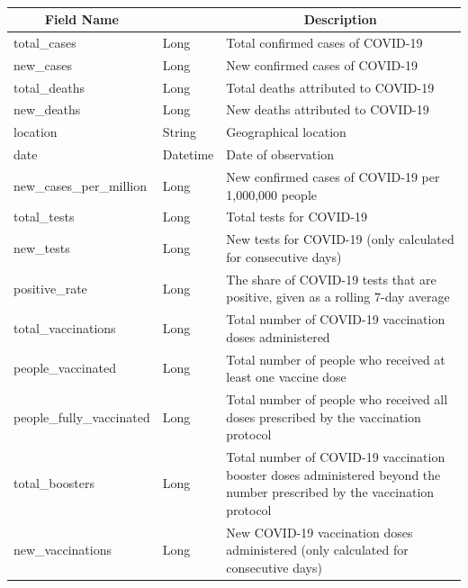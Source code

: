 \documentclass[a4paper,12pt]{article}
\begin{document}
\paragraph{}
\begin{center}
\begin{tabular}{|m{45mm}|>{\raggedright}m{16mm}|m{75mm}|}
\hline
\multicolumn{1}{|c|}{\textbf{ Field Name }}
& \multicolumn{1}{c|}{\textbf{ Data Type }} 
    	& \multicolumn{1}{c|}{\textbf{ Description }}\\
\hline
total\_cases & Long & Total confirmed cases of COVID-19 \\
\hline
new\_cases & Long & New confirmed cases of COVID-19 \\
\hline
total\_deaths & Long & Total deaths attributed to COVID-19 \\
\hline
new\_deaths & Long & New deaths attributed to COVID-19 \\
\hline
location & String & Geographical location \\
\hline
date & Datetime & Date of observation \\
\hline
new\_cases\_per\_million & Long & New confirmed cases of COVID-19 per 1,000,000 people \\
\hline
total\_tests & Long & Total tests for COVID-19 \\
\hline
new\_tests & Long & New tests for COVID-19 (only calculated for consecutive days) \\
\hline
positive\_rate & Long & The share of COVID-19 tests that are positive, given as a rolling 7-day average \\
\hline
total\_vaccinations & Long & Total number of COVID-19 vaccination doses administered \\
\hline
people\_vaccinated & Long & Total number of people who received at least one vaccine dose \\
\hline
people\_fully\_vaccinated & Long & Total number of people who received all doses prescribed by the vaccination protocol \\
\hline
total\_boosters & Long & Total number of COVID-19 vaccination booster doses administered beyond the number prescribed by the vaccination protocol \\
\hline
new\_vaccinations & Long & New COVID-19 vaccination doses administered (only calculated for consecutive days) \\
\hline
\end{tabular}
\end{center}
\end{document}
